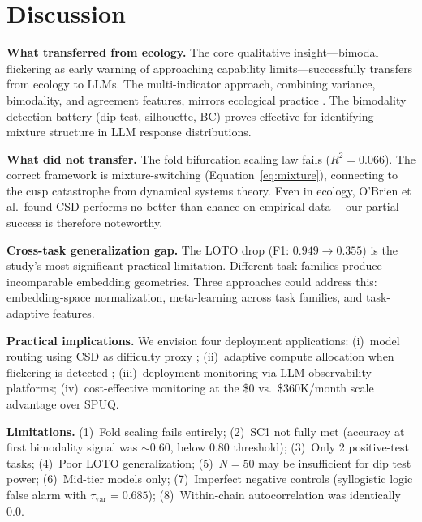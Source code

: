 \documentclass[11pt,letterpaper]{article}
\begin{document}
\section{Discussion}
\label{sec:discussion}

\textbf{What transferred from ecology.} The core qualitative insight---bimodal flickering as early warning of approaching capability limits---successfully transfers from ecology to LLMs. The multi-indicator approach, combining variance, bimodality, and agreement features, mirrors ecological practice \cite{dakos2012methods}. The bimodality detection battery (dip test, silhouette, BC) proves effective for identifying mixture structure in LLM response distributions.

\textbf{What did not transfer.} The fold bifurcation scaling law fails ($R^2{=}0.066$). The correct framework is mixture-switching (Equation~\ref{eq:mixture}), connecting to the cusp catastrophe from dynamical systems theory. Even in ecology, O'Brien et al.\ found CSD performs no better than chance on empirical data \cite{obrien2023}---our partial success is therefore noteworthy.

\textbf{Cross-task generalization gap.} The LOTO drop (F1: $0.949 \to 0.355$) is the study's most significant practical limitation. Different task families produce incomparable embedding geometries. Three approaches could address this: embedding-space normalization, meta-learning across task families, and task-adaptive features.

\textbf{Practical implications.} We envision four deployment applications: (i)~model routing using CSD as difficulty proxy \cite{ding2025bestroute}; (ii)~adaptive compute allocation when flickering is detected \cite{wu2025modec}; (iii)~deployment monitoring via LLM observability platforms; (iv)~cost-effective monitoring at the \$0 vs.\ \$360K/month scale advantage over SPUQ.

\textbf{Limitations.} (1)~Fold scaling fails entirely; (2)~SC1 not fully met (accuracy at first bimodality signal was ${\sim}$0.60, below 0.80 threshold); (3)~Only 2 positive-test tasks; (4)~Poor LOTO generalization; (5)~$N{=}50$ may be insufficient for dip test power; (6)~Mid-tier models only; (7)~Imperfect negative controls (syllogistic logic false alarm with $\tau_{\text{var}}{=}0.685$); (8)~Within-chain autocorrelation was identically 0.0.
\end{document}
